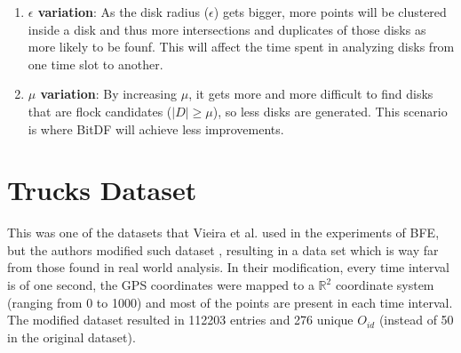 {\begin{enumerate}
    \item \textbf{$\epsilon$ variation}: As the disk radius ($\epsilon$) gets bigger, more points will be clustered
        inside a disk and thus more intersections and duplicates of those disks as more likely to be founf. This will
        affect the time spent in analyzing disks from one time slot to another. \label{sssec:gvariation}

    \item \textbf{$\mu$ variation}: By increasing $\mu$, it gets more and more difficult to find disks that are flock
        candidates ($|D| \ge \mu$), so less disks are generated. This scenario is where BitDF will achieve less
        improvements. \label{sssec:nvariation}
\end{enumerate}

\section{Trucks Dataset}
\label{sec:trucks}
This was one of the datasets that Vieira et al. \citep{vieira} used in the experiments of BFE, but the authors modified
such dataset \citep{trucksdataset}, resulting in a data set which is way far from those found in real world analysis. In
their modification, every time interval is of one second, the GPS coordinates were mapped to a $\mathbb{R}^2$ coordinate
system (ranging from 0 to 1000) and most of the points are present in each time interval. The modified dataset resulted
in 112203 entries and 276 unique $O_{id}$ (instead of 50 in the original dataset).

}
